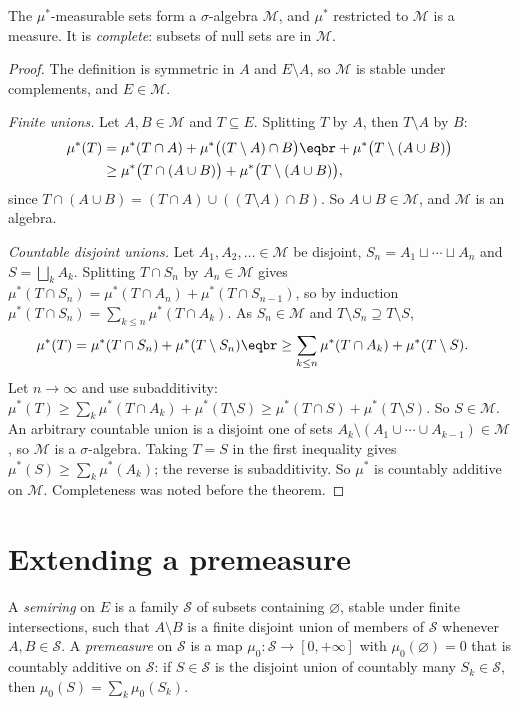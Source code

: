 \begin{theorem}\label{thm:caratheodory}
The $\mu^*$-measurable sets form a $\sigma$-algebra $\mathcal M$, and $\mu^*$ restricted to $\mathcal M$ is a measure. It is \emph{complete}: subsets of null sets are in $\mathcal M$.
\end{theorem}
\begin{proof}
The definition is symmetric in $A$ and $E\setminus A$, so $\mathcal M$ is stable under complements, and $E\in\mathcal M$.

\emph{Finite unions.} Let $A,B\in\mathcal M$ and $T\subseteq E$. Splitting $T$ by $A$, then $T\setminus A$ by $B$:
\[\begin{aligned}\mu^*(T)&=\mu^*(T\cap A)+\mu^*\bigl((T\setminus A)\cap B\bigr)\eqbr+\mu^*\bigl(T\setminus(A\cup B)\bigr)\\&\ge\mu^*\bigl(T\cap(A\cup B)\bigr)+\mu^*\bigl(T\setminus(A\cup B)\bigr),\end{aligned}\]
since $T\cap(A\cup B)=(T\cap A)\cup((T\setminus A)\cap B)$. So $A\cup B\in\mathcal M$, and $\mathcal M$ is an algebra.

\emph{Countable disjoint unions.} Let $A_1,A_2,\ldots\in\mathcal M$ be disjoint, $S_n=A_1\sqcup\cdots\sqcup A_n$ and $S=\bigsqcup_kA_k$. Splitting $T\cap S_n$ by $A_n\in\mathcal M$ gives $\mu^*(T\cap S_n)=\mu^*(T\cap A_n)+\mu^*(T\cap S_{n-1})$,
so by induction $\mu^*(T\cap S_n)=\sum_{k\le n}\mu^*(T\cap A_k)$. As $S_n\in\mathcal M$ and $T\setminus S_n\supseteq T\setminus S$,
\[\begin{aligned}\mu^*(T)&=\mu^*(T\cap S_n)+\mu^*(T\setminus S_n)\eqbr\ge\sum_{k\le n}\mu^*(T\cap A_k)+\mu^*(T\setminus S).\end{aligned}\]
Let $n\to\infty$ and use subadditivity: $\mu^*(T)\ge\sum_k\mu^*(T\cap A_k)+\mu^*(T\setminus S)\ge\mu^*(T\cap S)+\mu^*(T\setminus S)$. So $S\in\mathcal M$. An arbitrary countable union is a disjoint one
of sets $A_k\setminus(A_1\cup\cdots\cup A_{k-1})\in\mathcal M$, so $\mathcal M$ is a $\sigma$-algebra. Taking $T=S$ in the first inequality gives $\mu^*(S)\ge\sum_k\mu^*(A_k)$; the reverse is
subadditivity. So $\mu^*$ is countably additive on $\mathcal M$. Completeness was noted before the theorem.
\end{proof}

\section{Extending a premeasure}

\begin{definition}
A \emph{semiring} on $E$ is a family $\mathcal S$ of subsets containing $\varnothing$, stable under finite intersections, such that $A\setminus B$ is a finite disjoint union of members of
$\mathcal S$ whenever $A,B\in\mathcal S$. A \emph{premeasure} on $\mathcal S$ is a map $\mu_0:\mathcal S\to[0,+\infty]$ with $\mu_0(\varnothing)=0$ that is countably additive on $\mathcal S$: if $S\in\mathcal S$ is the disjoint union
of countably many $S_k\in\mathcal S$, then $\mu_0(S)=\sum_k\mu_0(S_k)$.
\end{definition}

